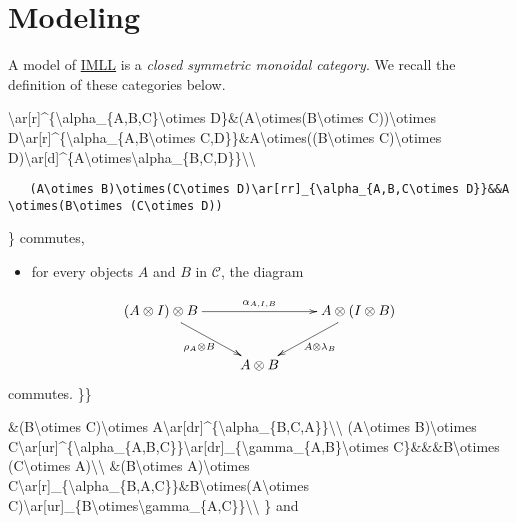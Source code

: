 \section{\texorpdfstring{Modeling }{Modeling IMLL}}\label{modeling-imll}

A model of \url{IMLL} is a \emph{closed symmetric monoidal category}. We
recall the definition of these categories below.

\textbackslash{}ar{[}r{]}\^{}\{\textbackslash{}alpha\_\{A,B,C\}\textbackslash{}otimes
D\}\&(A\textbackslash{}otimes(B\textbackslash{}otimes
C))\textbackslash{}otimes
D\textbackslash{}ar{[}r{]}\^{}\{\textbackslash{}alpha\_\{A,B\textbackslash{}otimes
C,D\}\}\&A\textbackslash{}otimes((B\textbackslash{}otimes
C)\textbackslash{}otimes
D)\textbackslash{}ar{[}d{]}\^{}\{A\textbackslash{}otimes\textbackslash{}alpha\_\{B,C,D\}\}\textbackslash{}\textbackslash{}

\texttt{~~~(A\textbackslash{}otimes~B)\textbackslash{}otimes(C\textbackslash{}otimes~D)\textbackslash{}ar{[}rr{]}\_\{\textbackslash{}alpha\_\{A,B,C\textbackslash{}otimes~D\}\}\&\&A\textbackslash{}otimes(B\textbackslash{}otimes~(C\textbackslash{}otimes~D))}

\} commutes,

\begin{itemize}
\item for every objects \(A\) and \(B\) in \(\mathcal{C}\), the diagram
\end{itemize}

\[\xymatrix{
    (A\otimes I)\otimes B\ar[dr]_{\rho_A\otimes B}\ar[rr]^{\alpha_{A,I,B}}& & \ar[dl]^{A\otimes\lambda_B}A\otimes(I\otimes B)\\
    & A\otimes B& 
}\] commutes. \}\}

\&(B\textbackslash{}otimes C)\textbackslash{}otimes
A\textbackslash{}ar{[}dr{]}\^{}\{\textbackslash{}alpha\_\{B,C,A\}\}\textbackslash{}\textbackslash{}
(A\textbackslash{}otimes B)\textbackslash{}otimes
C\textbackslash{}ar{[}ur{]}\^{}\{\textbackslash{}alpha\_\{A,B,C\}\}\textbackslash{}ar{[}dr{]}\_\{\textbackslash{}gamma\_\{A,B\}\textbackslash{}otimes
C\}\&\&\&B\textbackslash{}otimes (C\textbackslash{}otimes
A)\textbackslash{}\textbackslash{} \&(B\textbackslash{}otimes
A)\textbackslash{}otimes
C\textbackslash{}ar{[}r{]}\_\{\textbackslash{}alpha\_\{B,A,C\}\}\&B\textbackslash{}otimes(A\textbackslash{}otimes
C)\textbackslash{}ar{[}ur{]}\_\{B\textbackslash{}otimes\textbackslash{}gamma\_\{A,C\}\}\textbackslash{}\textbackslash{}
\} and

